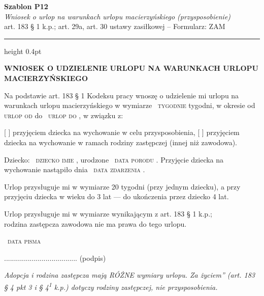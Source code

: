 \documentclass[11pt,a4paper]{article}
\newcommand{\Pole}[1]{%
  \textcolor{szary}{\dotfill}\,%
  {\scriptsize\textcolor{szary}{\textsc{#1}}}%
}
\newenvironment{warunek}[1]{%
  \par\smallskip\noindent\begin{minipage}{\linewidth}%
  \color{black}%
}{%
  \end{minipage}\par\smallskip%
}
\newcommand{\NaglowekPisma}[1]{%
  \par\vspace{0.8em}%
  \begin{center}%
    {\large\bfseries\MakeUppercase{#1}}%
  \end{center}%
  \vspace{0.4em}%
}
\begin{document}
\begin{flushright}
{\footnotesize\color{szary}
\textbf{Szablon P12}\\
{\itshape Wniosek o urlop na warunkach urlopu macierzyńskiego (przysposobienie)}\\
art. 183 \S{} 1 k.p.; art. 29a, art. 30 ustawy zasiłkowej -- Formularz: ZAM}\
\end{flushright}

\vspace{0.5em}
{\color{ramka}\hrule height 0.4pt}
\vspace{0.8em}

\NaglowekPisma{WNIOSEK O UDZIELENIE URLOPU NA WARUNKACH URLOPU MACIERZYŃSKIEGO}

Na podstawie art. 183 \S{} 1 Kodeksu pracy wnoszę o udzielenie mi urlopu na
warunkach urlopu macierzyńskiego w wymiarze \Pole{tygodnie} tygodni, w okresie
od \Pole{urlop od} do \Pole{urlop do}, w związku z:

[ ] przyjęciem dziecka na wychowanie w celu przysposobienia,
[ ] przyjęciem dziecka na wychowanie w ramach rodziny zastępczej
(innej niż zawodowa).

Dziecko: \Pole{dziecko imie}, urodzone \Pole{data porodu}.
Przyjęcie dziecka na wychowanie nastąpiło dnia \Pole{data zdarzenia}.

\begin{warunek}{jesli_przysposobienie}
Urlop przysługuje mi w wymiarze 20 tygodni (przy jednym dziecku), a przy\\[-2pt]
przyjęciu dziecka w wieku do 3 lat --- do ukończenia przez dziecko 4 lat.
\end{warunek}

\begin{warunek}{jesli_zastępca}
Urlop przysługuje mi w wymiarze wynikającym z art. 183 \S{} 1 k.p.;\\[-2pt]
rodzina zastępcza zawodowa nie ma prawa do tego urlopu.
\end{warunek}

\Pole{data pisma}
.....................................
(podpis)

\vfill
{\footnotesize\textcolor{szary}\itshape Adopcja i rodzina zastępcza mają RÓŻNE wymiary urlopu. \quotedblbase{}Za życiem\textquotedblright{} (art. 183 \S{} 4 pkt 3 i \S{} 4\textsuperscript{1} k.p.) dotyczy rodziny zastępczej, nie przysposobienia. }
\end{document}
